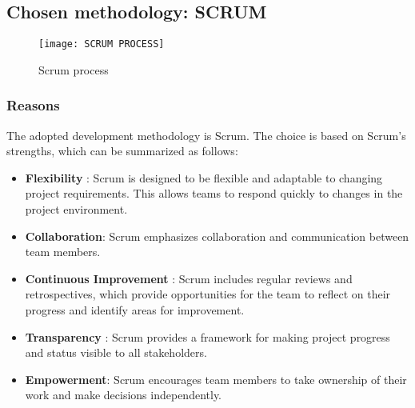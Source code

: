 \newpage
\subsection{Chosen methodology: SCRUM}
\FloatBarrier
\begin{figure}[h]
         \centering
        \texttt{[image: SCRUM PROCESS]}
   
        \caption{Scrum process}
        \label{fig:Scrum process}
    \end{figure}
\FloatBarrier
   
\subsubsection{Reasons}
The adopted development methodology is Scrum. The choice is based on Scrum's strengths, which can be summarized as follows:
\begin{itemize}
\item \textbf{Flexibility} : Scrum is designed to be flexible and adaptable to changing project requirements. This allows teams to respond quickly to changes in the project environment.\cite{Aw15}\cite{PGC10}

\item \textbf{Collaboration}: Scrum emphasizes collaboration and communication between team members. \cite{Aw15}\cite{PGC10}

\item \textbf{Continuous Improvement} : Scrum includes regular reviews and retrospectives, which provide opportunities for the team to reflect on their progress and identify areas for improvement.\cite{Aw15}\cite{PGC10}

\item \textbf{Transparency} : Scrum provides a framework for making project progress and status visible to all stakeholders.\cite{Aw15}\cite{PGC10}

\item \textbf{Empowerment}: Scrum encourages team members to take ownership of their work and make decisions independently.\cite{Aw15}\cite{PGC10}
\end{itemize}
